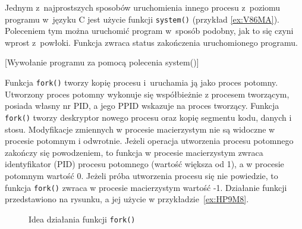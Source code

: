Jednym z~najprostszych sposobów uruchomienia innego procesu z~poziomu programu
w~języku C jest użycie funkcji \texttt{system()} (przykład \ref{ex:V86MA}).
Poleceniem tym można uruchomić program w~sposób podobny, jak to się czyni
wprost z~powłoki. Funkcja zwraca status zakończenia uruchomionego programu.

\begin{example}{[Wywołanie programu za pomocą polecenia system()]}
  \label{ex:V86MA}
  
\end{example}

Funkcja \texttt{fork()} tworzy kopię procesu i~uruchamia ją jako proces
potomny. Utworzony proces potomny wykonuje się współbieżnie z procesem
tworzącym, posiada własny nr PID, a jego PPID wskazuje na proces tworzący.
Funkcja \texttt{fork()} tworzy deskryptor nowego procesu oraz kopię segmentu
kodu, danych i stosu. Modyfikacje zmiennych w procesie macierzystym nie są
widoczne w procesie potomnym i odwrotnie. Jeżeli operacja utworzenia procesu
potomnego zakończy się powodzeniem, to funkcja w procesie macierzystym zwraca
identyfikator (PID) procesu potomnego (wartość większa od 1), a w procesie
potomnym wartość 0. Jeżeli próba utworzenia procesu się nie powiedzie, to
funkcja \texttt{fork()} zwraca w procesie macierzystym wartość -1. Działanie
funkcji przedstawiono na rysunku, a jej użycie w przykładzie~\ref{ex:HP9M8}.

\begin{figure}
  \centering
  \caption{Idea działania funkcji \texttt{fork()}}
  \label{fig:S278F}
\end{figure}

